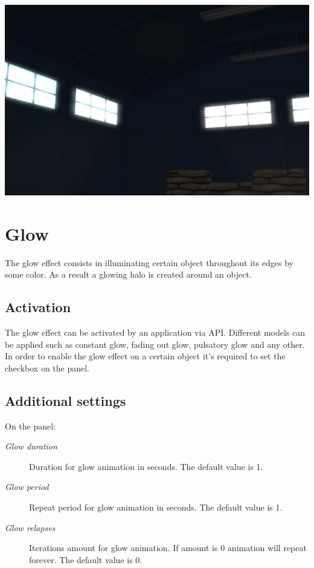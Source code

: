 \documentclass[a4paper,12pt,oneside]{sphinxmanual}
\begin{document}
{\hfill\includegraphics[width=1.000\linewidth]{bloom.jpg}\hfill}

\begin{DUlineblock}{0em}
\item[] 
\end{DUlineblock}


\section{Glow}
\label{postprocessing_effects:index-4}\label{postprocessing_effects:id17}\label{postprocessing_effects:glow}
The glow effect consists in illuminating certain object throughout its edges by some color. As a result a glowing halo is created around an object.


\subsection{Activation}
\label{postprocessing_effects:id18}
The glow effect can be activated by an application via API. Different models can be applied such as constant glow, fading out glow, pulsatory glow and any other. In order to enable the glow effect on a certain object it's required to set the  checkbox on the  panel.


\subsection{Additional settings}
\label{postprocessing_effects:id19}
On the  panel:
\begin{description}
\item[{\emph{Glow duration}}] \leavevmode
Duration for glow animation in seconds. The default value is 1.

\item[{\emph{Glow period}}] \leavevmode
Repeat period for glow animation in seconds. The default value is 1.

\item[{\emph{Glow relapses}}] \leavevmode
Iterations amount for glow animation. If amount is 0 animation will repeat forever. The default value is 0.

\end{description}
\end{document}
